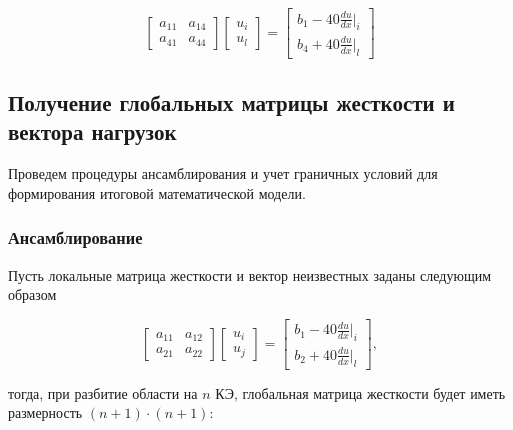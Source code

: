 $$ \begin{bmatrix}
a_{11}     &   a_{14}\\
a_{41}     &    a_{44}
\end{bmatrix}
\begin{bmatrix}
u_i \\
u_l
\end{bmatrix} =
\begin{bmatrix}
b_1   -40  \frac{du}{dx}|_i \\
b_4   +40  \frac{du}{dx}|_l
\end{bmatrix}$$

\subsection{Получение глобальных матрицы жесткости и вектора нагрузок}

Проведем процедуры ансамблирования и учет граничных условий для формирования итоговой математической модели.

\subsubsection{Ансамблирование}

Пусть локальные матрица жесткости и вектор неизвестных заданы следующим образом

$$
\begin{bmatrix}
a_{11}     &   a_{12}\\
a_{21}     &    a_{22}
\end{bmatrix}
\begin{bmatrix}
u_i \\
u_j
\end{bmatrix} =
\begin{bmatrix}
b_1   -40  \frac{du}{dx}|_i \\
b_2   +40  \frac{du}{dx}|_l
\end{bmatrix},$$

тогда, при разбитие области на $n$ КЭ, глобальная матрица жесткости  будет иметь размерность $(n+1)\cdot(n+1)$:

